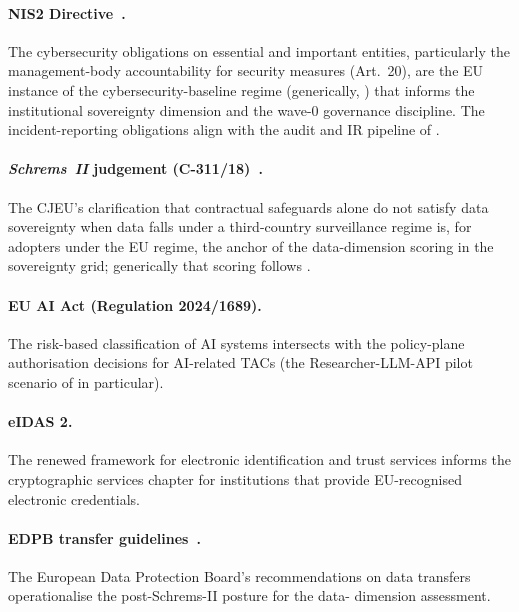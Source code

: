 \paragraph{NIS2 Directive~\cite{nis2}.} The cybersecurity
obligations on essential and important entities, particularly
the management-body accountability for security measures
(Art.~20), are the EU instance of the cybersecurity-baseline
regime (generically, ) that
informs the institutional sovereignty dimension and the wave-0
governance discipline. The incident-reporting
obligations align with the audit and IR pipeline of
.

\paragraph{\emph{Schrems~II} judgement
(C-311/18)~\cite{schrems2020}.} The CJEU's clarification that
contractual safeguards alone do not satisfy data sovereignty
when data falls under a third-country surveillance regime is,
for adopters under the EU regime, the anchor of the data-dimension
scoring in the sovereignty grid; generically that scoring follows
.

\paragraph{EU AI Act (Regulation 2024/1689).} The risk-based
classification of AI systems intersects with the policy-plane
authorisation decisions for AI-related TACs (the
Researcher-LLM-API pilot scenario of 
in particular).

\paragraph{eIDAS 2.} The renewed framework for electronic
identification and trust services informs the cryptographic
services chapter for institutions that provide EU-recognised
electronic credentials.

\paragraph{EDPB transfer
guidelines~\cite{edpb-guidelines}.} The European Data
Protection Board's recommendations on data transfers
operationalise the post-Schrems-II posture for the data-
dimension assessment.

